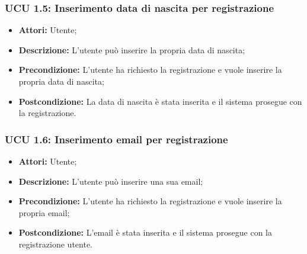 \hypertarget{U1.5}{}
\subsubsection{UCU 1.5: Inserimento data di nascita per registrazione}
\begin{itemize}
	\item \textbf{Attori:} Utente;
	\item \textbf{Descrizione:} L'utente può inserire la propria data di nascita;
	\item \textbf{Precondizione:} L'utente ha richiesto la registrazione e vuole inserire la propria data di nascita;
	\item \textbf{Postcondizione:} La data di nascita è stata inserita e il sistema prosegue con la registrazione.
\end{itemize}

\hypertarget{U1.6}{}
\subsubsection{UCU 1.6: Inserimento email per registrazione}
\begin{itemize}
	\item \textbf{Attori:} Utente;
	\item \textbf{Descrizione:} L'utente può inserire una sua email;
	\item \textbf{Precondizione:} L'utente ha richiesto la registrazione e vuole inserire la propria email;
\item \textbf{Postcondizione:} L'email è stata inserita e il sistema prosegue con la registrazione utente.
\end{itemize}

\hypertarget{U2}{}
